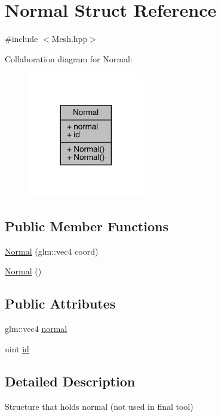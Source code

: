 \hypertarget{struct_normal}{}\section{Normal Struct Reference}
\label{struct_normal}


{\ttfamily \#include $<$Mesh.\+hpp$>$}



Collaboration diagram for Normal\+:\nopagebreak
\begin{figure}[H]
\begin{center}
\leavevmode
\includegraphics[width=144pt]{struct_normal__coll__graph}
\end{center}
\end{figure}
\subsection*{Public Member Functions}
\begin{DoxyCompactItemize}
\item 
\hyperlink{struct_normal_a19c72c824df84768e56cd6c610bf8edd}{Normal} (glm\+::vec4 coord)
\item 
\hyperlink{struct_normal_af62e51ec40dc2eedc3b9ca49ebdc7197}{Normal} ()
\end{DoxyCompactItemize}
\subsection*{Public Attributes}
\begin{DoxyCompactItemize}
\item 
glm\+::vec4 \hyperlink{struct_normal_a555de7ec7d67e743968b5f69af17dd1c}{normal}
\item 
uint \hyperlink{struct_normal_a39256c233377305342349bd73991d3e3}{id}
\end{DoxyCompactItemize}


\subsection{Detailed Description}
Structure that holds normal (not used in final tool) 

